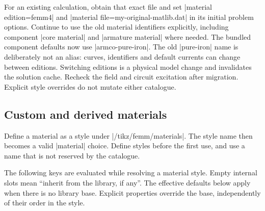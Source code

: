For an existing calculation, obtain that exact file and set
|material edition=femm4| and
|material file=my-original-matlib.dat| in its initial
problem options. Continue to use the old material identifiers explicitly,
including component |core material| and |armature material| where needed.
The bundled component defaults now use |armco-pure-iron|. The old |pure-iron|
name is deliberately not an alias: curves, identifiers and default currents can
change between editions. Switching editions is a physical model change and
invalidates the solution cache. Recheck the field and circuit excitation after
migration. Explicit style overrides do not mutate either catalogue.

\begin{codeexample}[width=0pt]
\end{codeexample}

\subsection{Custom and derived materials}
Define a material as a style under |/tikz/femm/materials|. The style name
then becomes a valid |material| choice. Define styles before the first
use, and use a name that is not reserved by the catalogue.
\begin{codeexample}
\end{codeexample}

The following keys are evaluated while resolving a material style. Empty
internal slots mean ``inherit from the library, if any''. The effective
defaults below apply when there is no library base. Explicit properties
override the base, independently of their order in the style.


